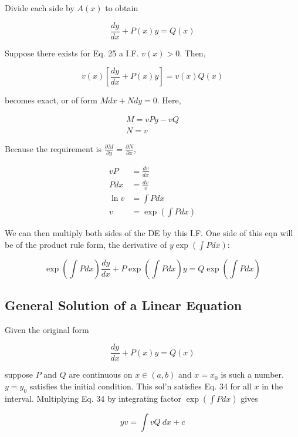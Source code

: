 Divide each side by $A(x)$ to obtain

\begin{equation*}
    \frac{dy}{dx}+P(x)y=Q(x)
\end{equation*}

Suppose there exists for Eq. 25 a I.F. $v(x)>0$. Then,

\begin{equation*}
    v(x)\left[\frac{dy}{dx}+P(x)y\right]=v(x)Q(x)
\end{equation*}

becomes exact, or of form $Mdx+Ndy=0$. Here,

\begin{eqnarray}
    M=vPy-vQ\\
    N=v
\end{eqnarray}

Because the requirement is $\frac{\partial M}{\partial y}=\frac{\partial N}{\partial x}$,

\begin{align*}
    vP&=\frac{dv}{dx}\\
    Pdx&=\frac{dv}{v}\\
    \ln v&=\int Pdx\\
    v&=\exp(\int Pdx)
\end{align*}

We can then multiply both sides of the DE by this I.F. One side of this eqn will be of the product rule form, the derivative of $y\exp (\int Pdx)$:

\begin{equation*}
    \exp(\int Pdx)\frac{dy}{dx}+P\exp(\int Pdx)y=Q\exp(\int Pdx)
\end{equation*}

\subsection{General Solution of a Linear Equation}

Given the original form

\begin{equation*}
    \frac{dy}{dx}+P(x)y=Q(x)
\end{equation*}

suppose $P$ and $Q$ are continuous on $x\in (a,b)$ and $x=x_0$ is such a number. $y=y_0$ satisfies the initial condition.
This sol'n satisfies Eq. 34 for all $x$ in the interval. Multiplying Eq. 34 by integrating factor $\exp(\int Pdx)$ gives

\begin{equation*}
    yv=\int vQ\:dx + c
\end{equation*}

